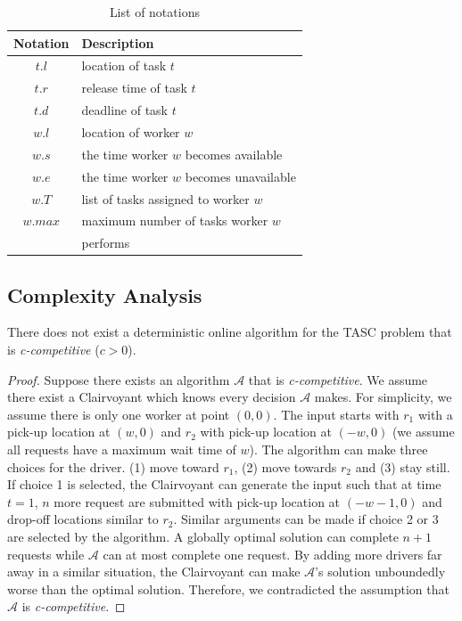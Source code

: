 \begin{table}
\begin{center}
\begin{tabular}{| c | l |} \hline
Notation	&	Description \\ \hline
$t.l$		&	location of task $t$ \\ \hline
$t.r$		&	release time of task $t$ \\ \hline
$t.d$		& 	deadline of task $t$ \\ \hline
$w.l$		&	location of worker $w$ \\ \hline
$w.s$		&	the time worker $w$ becomes available \\ \hline
$w.e$		&	the time worker $w$ becomes unavailable \\ \hline
$w.T$		&	list of tasks assigned to worker $w$ \\ \hline
$w.max$		&	maximum number of tasks worker $w$ \\
			&	performs \\ \hline
\end{tabular}
\caption{List of notations}
\label{tab:notation}
\end{center}
\end{table}

\subsection{Complexity Analysis}

\begin{theorem}
\label{th:comp_ratio}
There does not exist a deterministic online algorithm for the TASC problem that is \textit{c-competitive} ($c > 0$). 
\end{theorem}

\begin{proof}
Suppose there exists an algorithm $\mathcal{A}$ that is \textit{c-competitive}. We assume there exist a Clairvoyant which knows every decision $\mathcal{A}$ makes. For simplicity, we assume there is only one worker at point $(0, 0)$. The input starts with $r_1$ with a pick-up location at $(w, 0)$ and $r_2$ with pick-up location at $(-w, 0)$ (we assume all requests have a maximum wait time of $w$). The algorithm can make three choices for the driver. (1) move toward $r_1$, (2) move towards $r_2$ and (3) stay still. If choice 1 is selected, the Clairvoyant can generate the input such that at time $t = 1$, $n$ more request are submitted with pick-up location at $(-w-1, 0)$ and drop-off locations similar to $r_2$. Similar arguments can be made if choice 2 or 3 are selected by the algorithm. A globally optimal solution can complete $n+1$ requests while $\mathcal{A}$ can at most complete one request. By adding more drivers far away in a similar situation, the Clairvoyant can make $\mathcal{A}$'s solution unboundedly worse than the optimal solution. Therefore, we contradicted the assumption that $\mathcal{A}$ is \textit{c-competitive}.
\end{proof}

